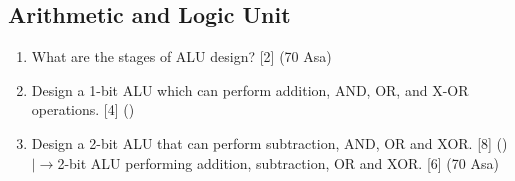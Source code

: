 \documentclass[12pt]{article}
\newcommand{\lb}{\\$\left|\rightarrow\right.$}
\begin{document}
	\subsection{Arithmetic and Logic Unit}
	\begin{enumerate}
		\item What are the stages of ALU design? \hfill [2] (70 Asa)
	
		\item Design a 1-bit ALU which can perform addition, AND, OR, and X-OR operations. \hfill [4] ()
		
		\item Design a 2-bit ALU that can perform subtraction, AND, OR and XOR. \hfill [8] ()
		\lb 2-bit ALU performing addition, subtraction, OR and XOR. \hfill [6] (70 Asa)
	\end{enumerate}
\end{document}
